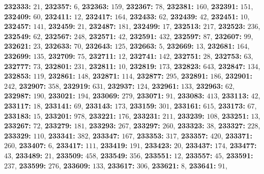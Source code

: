 \textsf{\bfseries 232333:} $21$, \textsf{\bfseries 232357:} $6$, \textsf{\bfseries 232363:} $159$, \textsf{\bfseries 232367:} $78$, \textsf{\bfseries 232381:} $160$, \textsf{\bfseries 232391:} $151$, \textsf{\bfseries 232409:} $60$, \textsf{\bfseries 232411:} $12$, \textsf{\bfseries 232417:} $164$, \textsf{\bfseries 232433:} $62$, \textsf{\bfseries 232439:} $42$, \textsf{\bfseries 232451:} $10$, \textsf{\bfseries 232457:} $141$, \textsf{\bfseries 232459:} $21$, \textsf{\bfseries 232487:} $181$, \textsf{\bfseries 232499:} $17$, \textsf{\bfseries 232513:} $217$, \textsf{\bfseries 232523:} $236$, \textsf{\bfseries 232549:} $62$, \textsf{\bfseries 232567:} $248$, \textsf{\bfseries 232571:} $42$, \textsf{\bfseries 232591:} $432$, \textsf{\bfseries 232597:} $87$, \textsf{\bfseries 232607:} $99$, \textsf{\bfseries 232621:} $23$, \textsf{\bfseries 232633:} $70$, \textsf{\bfseries 232643:} $125$, \textsf{\bfseries 232663:} $5$, \textsf{\bfseries 232669:} $13$, \textsf{\bfseries 232681:} $164$, \textsf{\bfseries 232699:} $135$, \textsf{\bfseries 232709:} $75$, \textsf{\bfseries 232711:} $12$, \textsf{\bfseries 232741:} $142$, \textsf{\bfseries 232751:} $28$, \textsf{\bfseries 232753:} $63$, \textsf{\bfseries 232777:} $73$, \textsf{\bfseries 232801:} $231$, \textsf{\bfseries 232811:} $10$, \textsf{\bfseries 232819:} $173$, \textsf{\bfseries 232823:} $643$, \textsf{\bfseries 232847:} $134$, \textsf{\bfseries 232853:} $119$, \textsf{\bfseries 232861:} $148$, \textsf{\bfseries 232871:} $114$, \textsf{\bfseries 232877:} $295$, \textsf{\bfseries 232891:} $186$, \textsf{\bfseries 232901:} $242$, \textsf{\bfseries 232907:} $358$, \textsf{\bfseries 232919:} $631$, \textsf{\bfseries 232937:} $124$, \textsf{\bfseries 232961:} $133$, \textsf{\bfseries 232963:} $62$, \textsf{\bfseries 232987:} $190$, \textsf{\bfseries 233021:} $194$, \textsf{\bfseries 233069:} $279$, \textsf{\bfseries 233071:} $91$, \textsf{\bfseries 233083:} $413$, \textsf{\bfseries 233113:} $42$, \textsf{\bfseries 233117:} $18$, \textsf{\bfseries 233141:} $69$, \textsf{\bfseries 233143:} $173$, \textsf{\bfseries 233159:} $301$, \textsf{\bfseries 233161:} $615$, \textsf{\bfseries 233173:} $67$, \textsf{\bfseries 233183:} $15$, \textsf{\bfseries 233201:} $978$, \textsf{\bfseries 233221:} $176$, \textsf{\bfseries 233231:} $211$, \textsf{\bfseries 233239:} $108$, \textsf{\bfseries 233251:} $13$, \textsf{\bfseries 233267:} $72$, \textsf{\bfseries 233279:} $181$, \textsf{\bfseries 233293:} $267$, \textsf{\bfseries 233297:} $260$, \textsf{\bfseries 233323:} $38$, \textsf{\bfseries 233327:} $228$, \textsf{\bfseries 233329:} $110$, \textsf{\bfseries 233341:} $382$, \textsf{\bfseries 233347:} $167$, \textsf{\bfseries 233353:} $317$, \textsf{\bfseries 233357:} $420$, \textsf{\bfseries 233371:} $260$, \textsf{\bfseries 233407:} $6$, \textsf{\bfseries 233417:} $111$, \textsf{\bfseries 233419:} $191$, \textsf{\bfseries 233423:} $20$, \textsf{\bfseries 233437:} $174$, \textsf{\bfseries 233477:} $43$, \textsf{\bfseries 233489:} $21$, \textsf{\bfseries 233509:} $458$, \textsf{\bfseries 233549:} $356$, \textsf{\bfseries 233551:} $12$, \textsf{\bfseries 233557:} $45$, \textsf{\bfseries 233591:} $237$, \textsf{\bfseries 233599:} $276$, \textsf{\bfseries 233609:} $133$, \textsf{\bfseries 233617:} $306$, \textsf{\bfseries 233621:} $8$, \textsf{\bfseries 233641:} $91$, 
